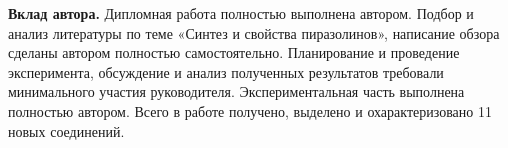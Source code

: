 \textbf{Вклад автора.}
Дипломная работа полностью выполнена автором.
Подбор и анализ литературы по теме «Синтез и свойства пиразолинов», написание обзора сделаны автором полностью самостоятельно.
Планирование и проведение эксперимента, обсуждение и анализ полученных результатов требовали минимального участия руководителя.
Экспериментальная часть выполнена полностью автором.
Всего в работе получено, выделено и охарактеризовано 11  новых соединений. 